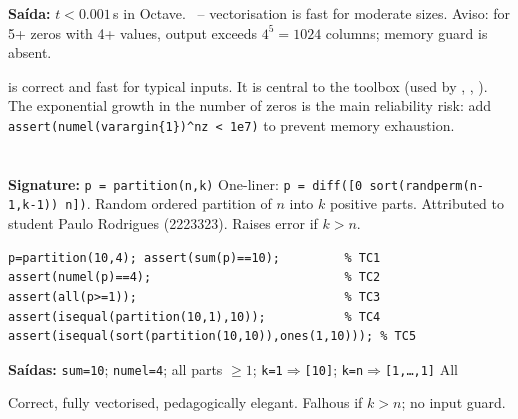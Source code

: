 \begin{tcolorbox}[Pbox,title={TC6 -- Desempenho (3 zeros, 4 values $\Rightarrow$ 64 columns)}]
\textbf{Saída:} $t < 0.001$\,s in Octave. \APROVADO\ --  vectorisation is fast for moderate sizes. Aviso: for 5+ zeros with 4+ values, output exceeds $4^5=1024$ columns; memory guard is absent.
\end{tcolorbox}
\begin{concl}
 is correct and fast for typical inputs. It is central to the toolbox (used by , , ). The exponential growth in the number of zeros is the main reliability risk: add \lstinline|assert(numel(varargin{1})^nz < 1e7)| to prevent memory exhaustion.
\end{concl}

\chapter{}
\begin{tcolorbox}[Abox,title={Analysis}]
\textbf{Signature:} \lstinline|p = partition(n,k)|\quad
One-liner: \lstinline|p = diff([0 sort(randperm(n-1,k-1)) n])|. Random ordered partition of $n$ into $k$ positive parts. Attributed to student Paulo Rodrigues (2223323). Raises error if $k>n$.
\end{tcolorbox}
\begin{lstlisting}[caption={Tests for partition.m}]
p=partition(10,4); assert(sum(p)==10);         % TC1
assert(numel(p)==4);                           % TC2
assert(all(p>=1));                             % TC3
assert(isequal(partition(10,1),10));           % TC4
assert(isequal(sort(partition(10,10)),ones(1,10))); % TC5
\end{lstlisting}
\begin{tcolorbox}[Pbox,title={TC1--TC5 -- All pass}]
\textbf{Saídas:} \texttt{sum=10}; \texttt{numel=4}; all parts $\geq1$; \texttt{k=1}$\Rightarrow$\texttt{[10]}; \texttt{k=n}$\Rightarrow$\texttt{[1,\ldots,1]} \quad All \APROVADO
\end{tcolorbox}
\begin{concl}
Correct, fully vectorised, pedagogically elegant. Falhous if $k>n$; no input guard.
\end{concl}

